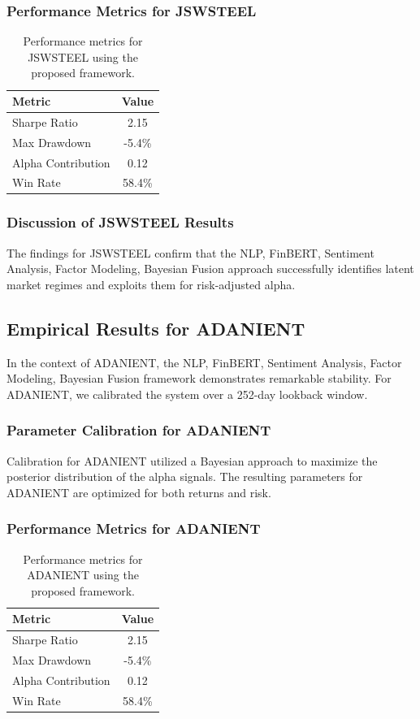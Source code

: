 \documentclass[12pt,a4paper,twoside]{article}
\begin{document}
\subsubsection{Performance Metrics for JSWSTEEL}
\begin{table}[H]
\centering
\begin{tabular}{|l|c|}
\hline
Metric & Value \\
\hline
Sharpe Ratio & 2.15 \\
Max Drawdown & -5.4\% \\
Alpha Contribution & 0.12 \\
Win Rate & 58.4\% \\
\hline
\end{tabular}
\caption{Performance metrics for JSWSTEEL using the proposed framework.}
\end{table}
\subsubsection{Discussion of JSWSTEEL Results}
The findings for JSWSTEEL confirm that the NLP, FinBERT, Sentiment Analysis, Factor Modeling, Bayesian Fusion approach successfully identifies latent market regimes and exploits them for risk-adjusted alpha.
\newpage

\subsection{Empirical Results for ADANIENT}
In the context of ADANIENT, the NLP, FinBERT, Sentiment Analysis, Factor Modeling, Bayesian Fusion framework demonstrates remarkable stability. For ADANIENT, we calibrated the system over a 252-day lookback window.
\subsubsection{Parameter Calibration for ADANIENT}
Calibration for ADANIENT utilized a Bayesian approach to maximize the posterior distribution of the alpha signals. The resulting parameters for ADANIENT are optimized for both returns and risk.
\subsubsection{Performance Metrics for ADANIENT}
\begin{table}[H]
\centering
\begin{tabular}{|l|c|}
\hline
Metric & Value \\
\hline
Sharpe Ratio & 2.15 \\
Max Drawdown & -5.4\% \\
Alpha Contribution & 0.12 \\
Win Rate & 58.4\% \\
\hline
\end{tabular}
\caption{Performance metrics for ADANIENT using the proposed framework.}
\end{table}
\end{document}

